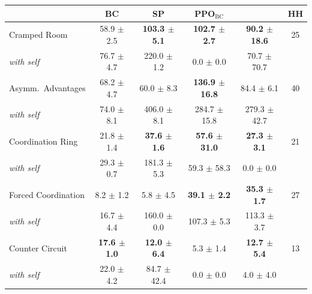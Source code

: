 \begin{tabular}{lccccc}
\toprule
 & BC & SP & PPO$_{\mathrm{BC}}$ & \facet{} & HH \\
\midrule
Cramped Room & 58.9 $\pm$ 2.5 & \textbf{103.3 $\pm$ 5.1} & \textbf{102.7 $\pm$ 2.7} & \textbf{90.2 $\pm$ 18.6} & 25 \\
\quad\emph{with self} & 76.7 $\pm$ 4.7 & 220.0 $\pm$ 1.2 & 0.0 $\pm$ 0.0 & 70.7 $\pm$ 70.7 & \\
Asymm.\ Advantages & 68.2 $\pm$ 4.7 & 60.0 $\pm$ 8.3 & \textbf{136.9 $\pm$ 16.8} & 84.4 $\pm$ 6.1 & 40 \\
\quad\emph{with self} & 74.0 $\pm$ 8.1 & 406.0 $\pm$ 8.1 & 284.7 $\pm$ 15.8 & 279.3 $\pm$ 42.7 & \\
Coordination Ring & 21.8 $\pm$ 1.4 & \textbf{37.6 $\pm$ 1.6} & \textbf{57.6 $\pm$ 31.0} & \textbf{27.3 $\pm$ 3.1} & 21 \\
\quad\emph{with self} & 29.3 $\pm$ 0.7 & 181.3 $\pm$ 5.3 & 59.3 $\pm$ 58.3 & 0.0 $\pm$ 0.0 & \\
Forced Coordination & 8.2 $\pm$ 1.2 & 5.8 $\pm$ 4.5 & \textbf{39.1 $\pm$ 2.2} & \textbf{35.3 $\pm$ 1.7} & 27 \\
\quad\emph{with self} & 16.7 $\pm$ 4.4 & 160.0 $\pm$ 0.0 & 107.3 $\pm$ 5.3 & 113.3 $\pm$ 3.7 & \\
Counter Circuit & \textbf{17.6 $\pm$ 1.0} & \textbf{12.0 $\pm$ 6.4} & 5.3 $\pm$ 1.4 & \textbf{12.7 $\pm$ 5.4} & 13 \\
\quad\emph{with self} & 22.0 $\pm$ 4.2 & 84.7 $\pm$ 42.4 & 0.0 $\pm$ 0.0 & 4.0 $\pm$ 4.0 & \\
\bottomrule
\end{tabular}